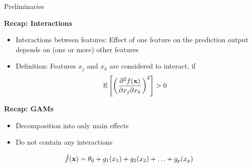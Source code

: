 \documentclass[10pt,compress,t,notes=noshow, xcolor=table]{beamer}
\begin{document}
\begin{frame}{Preliminaries}

    \textbf{Recap: Interactions}
    \begin{itemize}
        \item Interactions between features: Effect of one feature on the prediction output depends on (one or more) other features
        \item Definition: Features $x_j$  and $x_k$ are considered to interact, if
        $$
        \mathbb{E} \left[ \left( \frac{\partial^2 f(\mathbf{x})}{\partial x_j \partial x_k} \right)^2 \right] > 0
        $$
    \end{itemize}
    
    \pause
    \textbf{Recap: GAMs}
    \begin{itemize}
        \item Decomposition into only main effects
        \item Do not contain any interactions
    \end{itemize}
    $$
    \hat{f} (\mathbf{x}) = \theta_0 + g_1(x_1) + g_2(x_2) + \ldots + g_p(x_p)
    $$



\end{frame}
\end{document}

